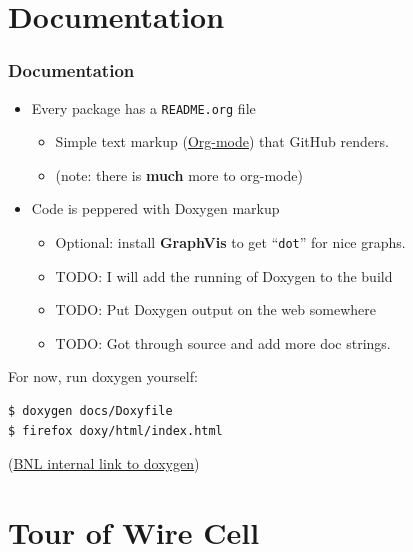 \documentclass[xcolor=dvipsnames]{beamer}
\begin{document}
\section{Documentation}

\begin{frame}[fragile]
\end{frame}

\begin{frame}[fragile]
  \frametitle{Documentation}
  \begin{itemize}
  \item Every package has a \texttt{README.org} file
    \begin{itemize}
    \item Simple text markup (\href{http://orgmode.org}{Org-mode})
      that GitHub renders.
    \item (note: there is \textbf{much} more to org-mode)
    \end{itemize}
  \item Code is peppered with Doxygen markup
    \begin{itemize}
    \item Optional: install \textbf{GraphVis} to get ``\texttt{dot}'' for nice graphs.
    \item TODO: I will add the running of Doxygen to the build
    \item TODO: Put Doxygen output on the web somewhere
    \item TODO: Got through source and add more doc strings.
    \end{itemize}
  \end{itemize}
  For now, run doxygen yourself:
\begin{verbatim}
$ doxygen docs/Doxyfile
$ firefox doxy/html/index.html
\end{verbatim}

  \begin{center}
    (\href{http://lycastus.phy.bnl.gov/~bviren/wire-cell-doxy/}{BNL internal link to doxygen})
  \end{center}
\end{frame}

\section{Tour of Wire Cell}

\begin{frame}[fragile]
\end{frame}
\end{document}
